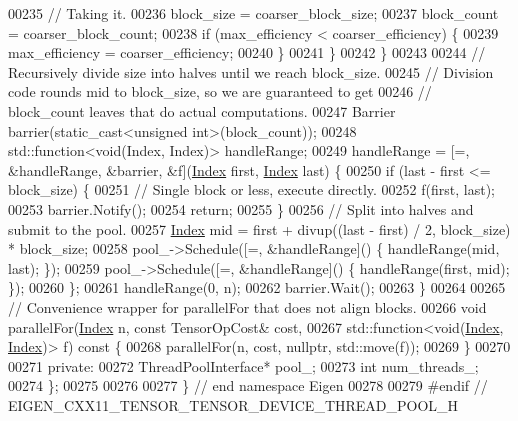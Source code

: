 \begin{DoxyCode}
00235         \textcolor{comment}{// Taking it.}
00236         block\_size = coarser\_block\_size;
00237         block\_count = coarser\_block\_count;
00238         \textcolor{keywordflow}{if} (max\_efficiency < coarser\_efficiency) \{
00239           max\_efficiency = coarser\_efficiency;
00240         \}
00241       \}
00242     \}
00243 
00244     \textcolor{comment}{// Recursively divide size into halves until we reach block\_size.}
00245     \textcolor{comment}{// Division code rounds mid to block\_size, so we are guaranteed to get}
00246     \textcolor{comment}{// block\_count leaves that do actual computations.}
00247     Barrier barrier(static\_cast<unsigned int>(block\_count));
00248     std::function<void(Index, Index)> handleRange;
00249     handleRange = [=, &handleRange, &barrier, &f](\hyperlink{namespace_eigen_a62e77e0933482dafde8fe197d9a2cfde}{Index} first, \hyperlink{namespace_eigen_a62e77e0933482dafde8fe197d9a2cfde}{Index} last) \{
00250       \textcolor{keywordflow}{if} (last - first <= block\_size) \{
00251         \textcolor{comment}{// Single block or less, execute directly.}
00252         f(first, last);
00253         barrier.Notify();
00254         \textcolor{keywordflow}{return};
00255       \}
00256       \textcolor{comment}{// Split into halves and submit to the pool.}
00257       \hyperlink{namespace_eigen_a62e77e0933482dafde8fe197d9a2cfde}{Index} mid = first + divup((last - first) / 2, block\_size) * block\_size;
00258       pool\_->Schedule([=, &handleRange]() \{ handleRange(mid, last); \});
00259       pool\_->Schedule([=, &handleRange]() \{ handleRange(first, mid); \});
00260     \};
00261     handleRange(0, n);
00262     barrier.Wait();
00263   \}
00264 
00265   \textcolor{comment}{// Convenience wrapper for parallelFor that does not align blocks.}
00266   \textcolor{keywordtype}{void} parallelFor(\hyperlink{namespace_eigen_a62e77e0933482dafde8fe197d9a2cfde}{Index} n, \textcolor{keyword}{const} TensorOpCost& cost,
00267                    std::function<\textcolor{keywordtype}{void}(\hyperlink{namespace_eigen_a62e77e0933482dafde8fe197d9a2cfde}{Index}, \hyperlink{namespace_eigen_a62e77e0933482dafde8fe197d9a2cfde}{Index})> f)\textcolor{keyword}{ const }\{
00268     parallelFor(n, cost, \textcolor{keyword}{nullptr}, std::move(f));
00269   \}
00270 
00271  \textcolor{keyword}{private}:
00272   ThreadPoolInterface* pool\_;
00273   \textcolor{keywordtype}{int} num\_threads\_;
00274 \};
00275 
00276 
00277 \}  \textcolor{comment}{// end namespace Eigen}
00278 
00279 \textcolor{preprocessor}{#endif // EIGEN\_CXX11\_TENSOR\_TENSOR\_DEVICE\_THREAD\_POOL\_H}
\end{DoxyCode}
